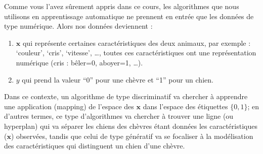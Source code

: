 \documentclass[letterpaper,11pt,english]{sphinxmanual}
\begin{document}
\sphinxAtStartPar
Comme vous l’avez sûrement appris dans ce cours, les algorithmes que
nous utilisons en apprentissage automatique ne prennent en entrée que
les données de type numérique. Alors nos données deviennent :
\begin{enumerate}
%
\item {} 
\sphinxAtStartPar
\(\mathbf{x}\) qui représente certaines caractéristiques des deux
animaux, par exemple : ‘couleur’, ‘cris’, ‘vitesse’, …, toutes ces
caractéristiques ont une représentation numérique (cris : bêler=0,
aboyer=1, …).

\item {} 
\sphinxAtStartPar
\(y\) qui prend la valeur “0” pour une chèvre et “1” pour un
chien.

\end{enumerate}

\sphinxAtStartPar
Dans ce contexte, un algorithme de type discriminatif va chercher à
apprendre une application (mapping) de l’espace des \(\mathbf{x}\)
dans l’espace des étiquettes \(\{0, 1\}\); en d’autres termes, ce
type d’algorithmes va chercher à trouver une ligne (ou hyperplan) qui va
séparer les chiens des chèvres étant données les caractéristiques
(\(\mathbf{x}\)) observées, tandis que celui de type génératif va se
focaliser à la modélisation des caractéristiques qui distinguent un
chien d’une chèvre.
\end{document}
